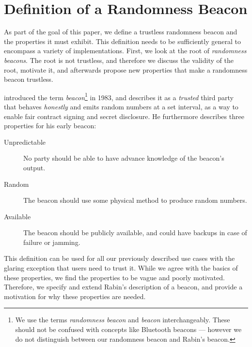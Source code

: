 \section{Definition of a Randomness Beacon}\label{sec:beacons}

As part of the goal of this paper, we define a trustless randomness beacon and the properties it must exhibit.
This definition needs to be sufficiently general to encompass a variety of implementations.
First, we look at the root of \emph{randomness beacons}.
The root is not trustless, and therefore we discuss the validity of the root, motivate it, and afterwards propose new properties that make a randomness beacon trustless.

\citet{rabin1983transaction} introduced the term \emph{beacon}\footnote{We use the terms \emph{randomness beacon} and \emph{beacon} interchangeably.
These should not be confused with concepts like Bluetooth beacons --- however we do not distinguish between our randomness beacon and Rabin's beacon.} in 1983, and describes it as a \emph{trusted} third party that behaves \emph{honestly} and emits random numbers at a set interval, as a way to enable fair contract signing and secret disclosure.
He furthermore describes three properties for his early beacon:

\begin{description}
    \item[Unpredictable] No party should be able to have advance knowledge of the beacon's output.
    \item[Random] The beacon should use some physical method to produce random numbers.
    \item[Available] The beacon should be publicly available, and could have backups in case of failure or jamming.
\end{description}

This definition can be used for all our previously described use cases with the glaring exception that users need to trust it.
While we agree with the basics of these properties, we find the properties to be vague and poorly motivated.
Therefore, we specify and extend Rabin's description of a beacon, and provide a motivation for why these properties are needed.


